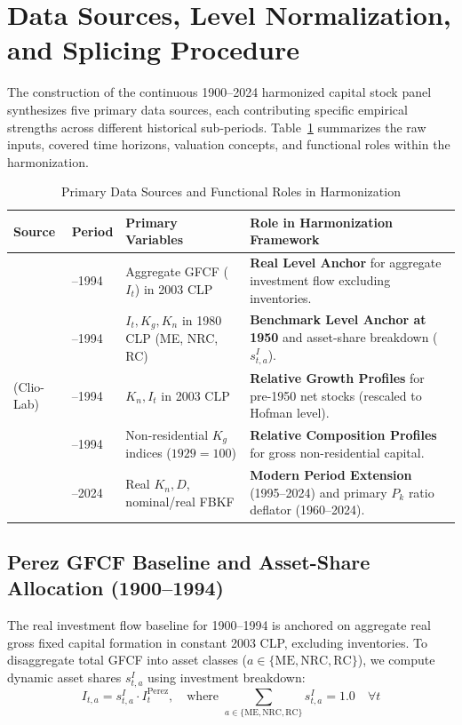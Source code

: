 \section{Data Sources, Level Normalization, and Splicing Procedure}\label{sec:harmonization}

The construction of the continuous 1900--2024 harmonized capital stock panel synthesizes five primary data sources, each contributing specific empirical strengths across different historical sub-periods. Table~\ref{tab:sources_summary} summarizes the raw inputs, covered time horizons, valuation concepts, and functional roles within the harmonization.

\begin{table}[htbp]
\centering
\caption{Primary Data Sources and Functional Roles in Harmonization}\label{tab:sources_summary}
\small
\begin{tabularx}{\textwidth}{>{\centering\arraybackslash}p{2.8cm} >{\centering\arraybackslash}p{1.8cm} p{4.0cm} p{5.2cm}}
\toprule
\textbf{Source} & \textbf{Period} & \textbf{Primary Variables} & \textbf{Role in Harmonization Framework} \\
\midrule
\citet{PerezEyzaguirre2019} & 1900--1994 & Aggregate GFCF ($I_t$) in 2003 CLP & \textbf{Real Level Anchor} for aggregate investment flow excluding inventories. \\
\citet{Hofman2000a, Hofman2000b} & 1950--1994 & $I_t, K_g, K_n$ in 1980 CLP (ME, NRC, RC) & \textbf{Benchmark Level Anchor at 1950} and asset-share breakdown ($s_{t,a}^I$). \\
\citet{DiazWagner2016} (Clio-Lab) & 1900--1994 & $K_n, I_t$ in 2003 CLP & \textbf{Relative Growth Profiles} for pre-1950 net stocks (rescaled to Hofman level). \\
\citet{TafunellDucoing2016} & 1900--1994 & Non-residential $K_g$ indices ($1929=100$) & \textbf{Relative Composition Profiles} for gross non-residential capital. \\
\citet{BCCH2024} & 1985--2024 & Real $K_n, D$, nominal/real FBKF & \textbf{Modern Period Extension} (1995--2024) and primary $P_k$ ratio deflator (1960--2024). \\
\bottomrule
\end{tabularx}
\end{table}

\subsection{Perez GFCF Baseline and Asset-Share Allocation (1900--1994)}
The real investment flow baseline for 1900--1994 is anchored on \citet{PerezEyzaguirre2019} aggregate real gross fixed capital formation in constant 2003 CLP, excluding inventories. To disaggregate total GFCF into asset classes ($a \in \{\text{ME}, \text{NRC}, \text{RC}\}$), we compute dynamic asset shares $s_{t,a}^I$ using \citet{Hofman2000a} investment breakdown:
\begin{equation}\label{eq:share_allocation}
I_{t,a} = s_{t,a}^I \cdot I_t^{\text{Perez}}, \quad \text{where } \sum_{a \in \{\text{ME},\text{NRC},\text{RC}\}} s_{t,a}^I = 1.0 \quad \forall t
\end{equation}

